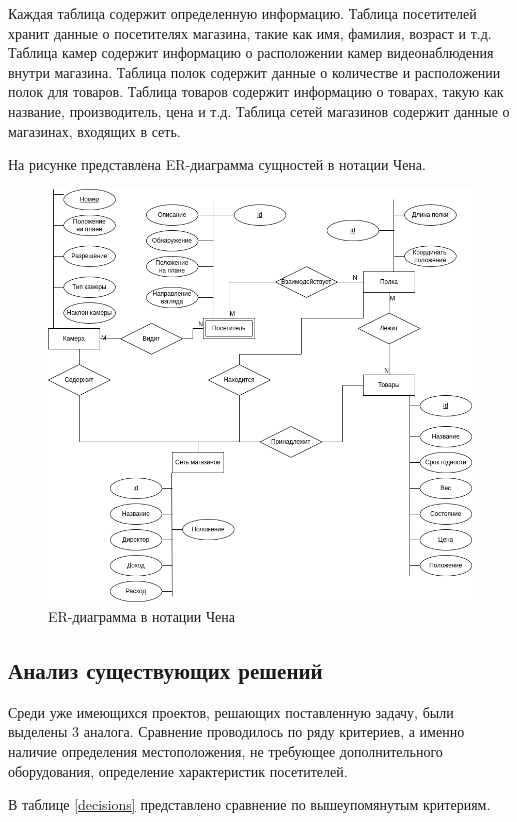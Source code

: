 Каждая таблица содержит определенную информацию. Таблица посетителей хранит данные о посетителях
магазина, такие как имя, фамилия, возраст и т.д. Таблица камер содержит информацию о расположении
камер видеонаблюдения внутри магазина. Таблица полок содержит данные о количестве и расположении
полок для товаров. Таблица товаров содержит информацию о товарах, такую как название, производитель,
цена и т.д. Таблица сетей магазинов содержит данные о магазинах, входящих в сеть.

На рисунке представлена ER-диаграмма сущностей в нотации Чена.

\begin{figure}[ht!]
	\centering
	\includegraphics[width=0.9\linewidth]{assets/images/ER.drawio.png}
	\caption{ER-диаграмма в нотации Чена}
	\label{fig:anal:chen}
\end{figure}
\FloatBarrier

\subsection{Анализ существующих решений}

Среди уже имеющихся проектов, решающих поставленную задачу, были выделены 3 аналога.
Сравнение проводилось по ряду критериев, а именно наличие определения местоположения, 
не требующее дополнительного оборудования, определение характеристик посетителей.

В таблице \ref{decisions} представлено сравнение по вышеупомянутым критериям.


